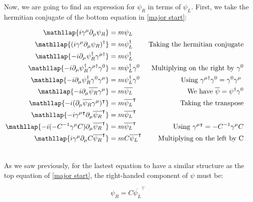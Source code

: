Now, we are going to find an expression for $\psi_R$ in terms of $\psi_L$. First, we take the hermitian conjugate of the bottom equation in \ref{major start}:

\begin{align}
  &\begin{aligned}
     \mathllap{i \gamma^\mu \partial_\mu \psi_R} &= m\psi_L\\        
     \mathllap{(i \gamma^\mu \partial_\mu \psi_R)^\dagger} &= m\psi_L^\dagger  & \text{Taking the hermitian conjugate} \\
     \mathllap{-i \partial_\mu \psi_R^\dagger \gamma^{\mu \dagger}} &= m \psi_L^\dagger \\
     \mathllap{-i \partial_\mu \psi_R^\dagger \gamma^{\mu \dagger}\gamma^0} &= m \psi_L^\dagger \gamma^0  &\text{Multiplying on the right by $\gamma^0$}\\
     \mathllap{-i \partial_\mu \psi_R^\dagger \gamma^0 \gamma^\mu} &= m \psi_L^\dagger \gamma^0  &\text{Using $\gamma^{\mu \dagger}\gamma^0 = \gamma^0 \gamma^\mu$ }\\    %
     \mathllap{-i \partial_\mu \overline{\psi_R}\gamma^\mu} &= m \overline{\psi_L} &\text{We have $\overline{\psi} = \psi^{\dagger}\gamma^0$}\\
     \mathllap{-i (\partial_\mu \overline{\psi_R}\gamma^\mu)^\intercal} &= m \overline{\psi_L}^\intercal &\text{Taking the transpose}\\
     \mathllap{-i \gamma^{\mu \intercal} \partial_\mu \overline{\psi_R}^\intercal} &= m \overline{\psi_L}^\intercal \\
     \mathllap{-i (-C^{-1}\gamma^\mu C) \partial_\mu \overline{\psi_R}^\intercal} &= m \overline{\psi_L}^\intercal &\text{Using $\gamma^{\mu \intercal}= -C^{-1}\gamma^\mu C$}\\
     \mathllap{i \gamma^\mu \partial_\mu C \overline{\psi_R}^\intercal} &= m C \overline{\psi_L}^\intercal &\text{Multiplying on the left by C}\\
  &\end{aligned}
\end{align}

As we saw previously, for the lastest equation to have a similar structure as the top equation of \ref{major start}, the right-handed component of $\psi$ must be:

\begin{equation}
 \psi_R = C \overline{\psi_L}^\intercal
\end{equation}

